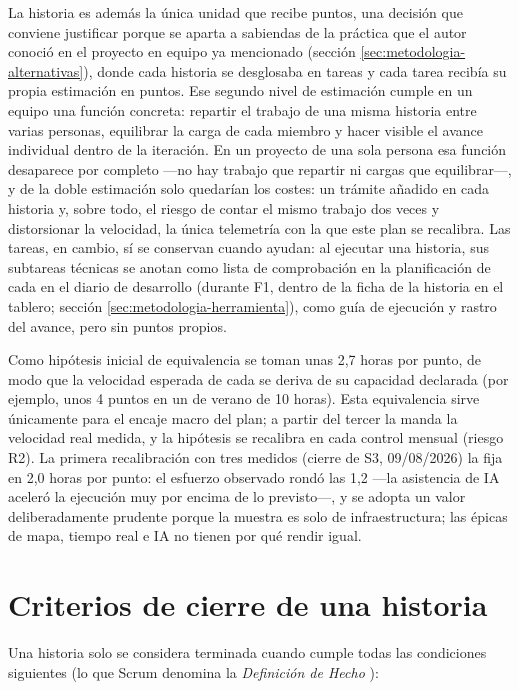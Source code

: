 La historia es además la única unidad que recibe puntos, una decisión que conviene justificar porque se aparta a sabiendas de la práctica que el autor conoció en el proyecto en equipo ya mencionado (sección \ref{sec:metodologia-alternativas}), donde cada historia se desglosaba en tareas y cada tarea recibía su propia estimación en puntos.
Ese segundo nivel de estimación cumple en un equipo una función concreta: repartir el trabajo de una misma historia entre varias personas, equilibrar la carga de cada miembro y hacer visible el avance individual dentro de la iteración.
En un proyecto de una sola persona esa función desaparece por completo —no hay trabajo que repartir ni cargas que equilibrar—, y de la doble estimación solo quedarían los costes: un trámite añadido en cada historia y, sobre todo, el riesgo de contar el mismo trabajo dos veces y distorsionar la velocidad, la única telemetría con la que este plan se recalibra.
Las tareas, en cambio, sí se conservan cuando ayudan: al ejecutar una historia, sus subtareas técnicas se anotan como lista de comprobación en la planificación de cada  en el diario de desarrollo (durante F1, dentro de la ficha de la historia en el tablero; sección \ref{sec:metodologia-herramienta}), como guía de ejecución y rastro del avance, pero sin puntos propios.

Como hipótesis inicial de equivalencia se toman unas 2,7 horas por punto, de modo que la velocidad esperada de cada  se deriva de su capacidad declarada (por ejemplo, unos 4 puntos en un  de verano de 10 horas).
Esta equivalencia sirve únicamente para el encaje macro del plan; a partir del tercer  la manda la velocidad real medida, y la hipótesis se recalibra en cada control mensual (riesgo R2).
La primera recalibración con tres  medidos (cierre de S3, 09/08/2026) la fija en 2,0 horas por punto: el esfuerzo observado rondó las 1,2 —la asistencia de \ac{IA} aceleró la ejecución muy por encima de lo previsto—, y se adopta un valor deliberadamente prudente porque la muestra es solo de infraestructura; las épicas de mapa, tiempo real e \ac{IA} no tienen por qué rendir igual.

\section{Criterios de cierre de una historia}
\label{sec:dod}

Una historia solo se considera terminada cuando cumple todas las condiciones siguientes (lo que Scrum denomina la \emph{Definición de Hecho} \parencite{scrum-guide}):

